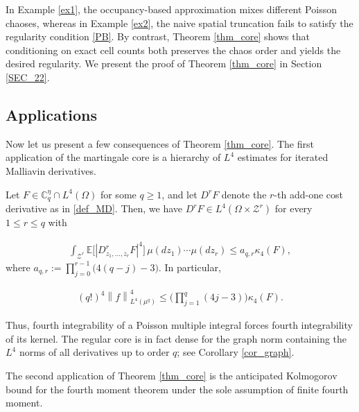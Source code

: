 \documentclass[ECP,preprint]{ejpecp}
\newcommand{\E}{\mathbb{E}}
\newcommand{\cZ}{\mathcal{Z}}
\newcommand{\bC}{\mathbb{C}^\eta}
\newcommand{\norm}[1]{\left\lVert #1\right\rVert}
\newcommand{\noi}{\noindent}
\begin{document}
In Example \ref{ex1}, 
the occupancy-based approximation mixes different Poisson chaoses, 
whereas in Example \ref{ex2}, the naive spatial truncation fails to 
satisfy the regularity condition \eqref{PB}. 
By contrast, Theorem \ref{thm_core} shows that 
conditioning on exact cell counts both preserves the chaos order 
and yields the desired regularity.
We present the proof of Theorem \ref{thm_core}
in Section \ref{SEC_22}.

 
 
 

\subsection{Applications} \label{SEC_13}
 Now let us present a few consequences of Theorem \ref{thm_core}.
The first application of the martingale core is a hierarchy
of $L^4$ estimates for iterated Malliavin derivatives.

\begin{theorem}\label{app1}
Let  $F\in\bC_q\cap L^4(\Omega)$ for some $q\geq 1$,
and let
$D^rF$ denote the $r$-th 
add-one cost derivative as in \eqref{def_MD}.
Then, we have $D^r F\in L^4(\Omega\times \cZ^r)$ for every $1 \leq r \leq q$
with

\noi
\begin{align}
  \int_{\cZ^r}\E\bigl[|D^r_{z_1, ..., z_r}F|^4\bigr]
  \,\mu(dz_1)\cdots \mu(dz_r)
  \leq a_{q,r}\kappa_4(F),
  \label{intro_der}
\end{align}
where 
$a_{q,r}
  :=\prod_{j=0}^{r-1}\big(4(q-j)-3\big).$
In particular, 

\noi
\begin{align}
  (q!)^4\norm{f}_{L^4(\mu^q)}^4
  \leq
  \Big(\prod_{j=1}^q(4j-3)\Big)\kappa_4(F).
  \label{intro_kernel}
\end{align}
\end{theorem}




Thus, fourth integrability of a Poisson multiple integral forces fourth
integrability of its kernel.  The regular core is in fact dense for
the graph norm containing the $L^4$ norms of all derivatives up to
order $q$; see Corollary \ref{cor_graph}.



  
The second application of Theorem \ref{thm_core}
is the anticipated Kolmogorov bound for the fourth moment theorem
under the sole assumption of finite fourth moment. 
\end{document}
